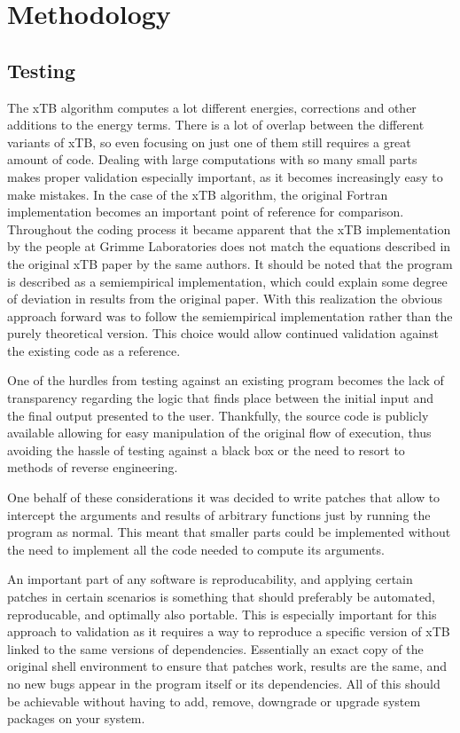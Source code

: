 \section{Methodology}

\subsection{Testing}

The xTB algorithm computes a lot different energies, corrections and other additions to the energy terms. There is a lot of overlap between the different variants of xTB, so even focusing on just one of them still requires a great amount of code.
Dealing with large computations with so many small parts makes proper validation especially important, as it becomes increasingly easy to make mistakes.
In the case of the xTB algorithm, the original Fortran implementation becomes an important point of reference for comparison. Throughout the coding process it became apparent that the xTB implementation by the people at Grimme Laboratories does not match the equations described in the original xTB paper by the same authors. It should be noted that the program is described as a semiempirical implementation, which could explain some degree of deviation in results from the original paper.
With this realization the obvious approach forward was to follow the semiempirical implementation rather than the purely theoretical version. This choice would allow continued validation against the existing code as a reference.

One of the hurdles from testing against an existing program becomes the lack of transparency regarding the logic that finds place between the initial input and the final output presented to the user. Thankfully, the source code is publicly available allowing for easy manipulation of the original flow of execution, thus avoiding the hassle of testing against a black box or the need to resort to methods of reverse engineering.

One behalf of these considerations it was decided to write patches that allow to intercept the arguments and results of arbitrary functions just by running the program as normal. This meant that smaller parts could be implemented without the need to implement all the code needed to compute its arguments.

An important part of any software is reproducability, and applying certain patches in certain scenarios is something that should preferably be automated, reproducable, and optimally also portable. This is especially important for this approach to validation as it requires a way to reproduce a specific version of xTB linked to the same versions of dependencies. Essentially an exact copy of the original shell environment to ensure that patches work, results are the same, and no new bugs appear in the program itself or its dependencies. All of this should be achievable without having to add, remove, downgrade or upgrade system packages on your system.

